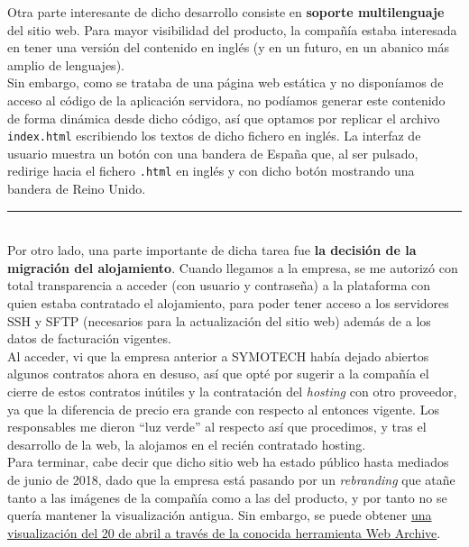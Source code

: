 \documentclass[13pt]{scrartcl}
\begin{document}
				Otra parte interesante de dicho desarrollo consiste en \textbf{soporte multilenguaje} del sitio web. Para mayor visibilidad del producto, la compañía estaba interesada en tener una versión del contenido en inglés (y en un futuro, en un abanico más amplio de lenguajes).\\
				
				Sin embargo, como se trataba de una página web estática y no disponíamos de acceso al código de la aplicación servidora, no podíamos generar este contenido de forma dinámica desde dicho código, así que optamos por replicar el archivo \texttt{index.html} escribiendo los textos de dicho fichero en inglés. La interfaz de usuario muestra un botón con una bandera de España que, al ser pulsado, redirige hacia el fichero \texttt{.html} en inglés y con dicho botón mostrando una bandera de Reino Unido.
				
				\noindent\rule{\textwidth}{0.4pt}\\
			
				Por otro lado, una parte importante de dicha tarea fue \textbf{la decisión de la migración del alojamiento}. Cuando llegamos a la empresa, se me autorizó con total transparencia a acceder (con usuario y contraseña) a la plataforma con quien estaba contratado el alojamiento, para poder tener acceso a los servidores SSH y SFTP (necesarios para la actualización del sitio web) además de a los datos de facturación vigentes.\\
				
				Al acceder, vi que la empresa anterior a SYMOTECH había dejado abiertos algunos contratos ahora en desuso, así que opté por sugerir a la compañía el cierre de estos contratos inútiles y la contratación del \textit{hosting} con otro proveedor, ya que la diferencia de precio era grande con respecto al entonces vigente. Los responsables me dieron ``luz verde'' al respecto así que procedimos, y tras el desarrollo de la web, la alojamos en el recién contratado hosting.\\
				
				Para terminar, cabe decir que dicho sitio web ha estado público hasta mediados de junio de 2018, dado que la empresa está pasando por un \textit{rebranding} que atañe tanto a las imágenes de la compañía como a las del producto, y por tanto no se quería mantener la visualización antigua. Sin embargo, se puede obtener \href{https://web.archive.org/web/20180420040111/https://www.dynasystem.es/}{una visualización del 20 de abril a través de la conocida herramienta Web Archive}.
\end{document}
